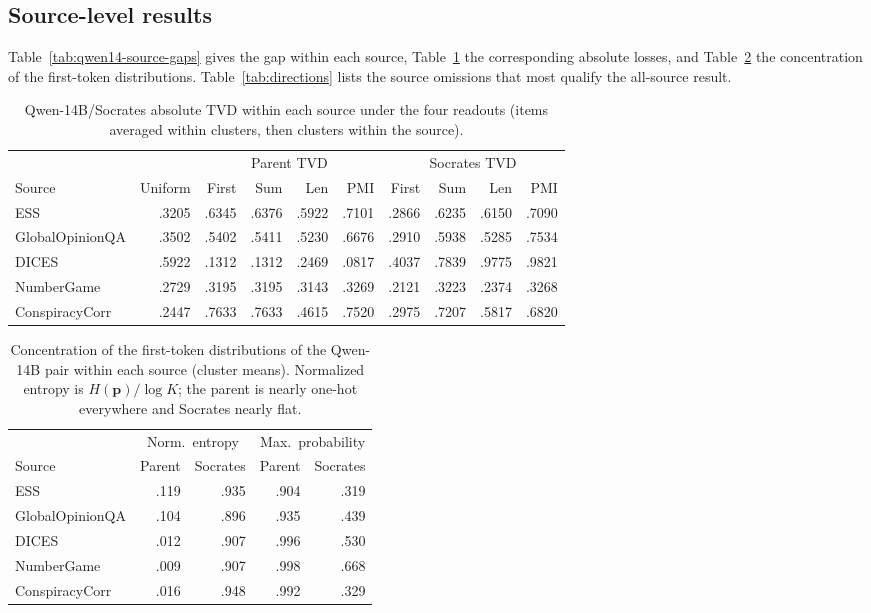 \documentclass[11pt]{article}
\begin{document}
\subsection{Source-level results}

Table~\ref{tab:qwen14-source-gaps} gives the gap within each
source, Table~\ref{tab:qwen14-source-absolute} the corresponding absolute
losses, and Table~\ref{tab:qwen14-concentration} the concentration of the
first-token distributions. Table~\ref{tab:directions} lists the source omissions that most
qualify the all-source result.



\begin{table}[t]
\centering
\scriptsize
\setlength{\tabcolsep}{4pt}
\begin{tabular}{@{}lrrrrrrrrr@{}}
\toprule
& & \multicolumn{4}{c}{Parent TVD} & \multicolumn{4}{c}{Socrates TVD} \\
\cmidrule(lr){3-6}\cmidrule(l){7-10}
Source & Uniform & First & Sum & Len & PMI & First & Sum & Len & PMI \\
\midrule
ESS & .3205 & .6345 & .6376 & .5922 & .7101 & .2866 & .6235 & .6150 & .7090 \\
GlobalOpinionQA & .3502 & .5402 & .5411 & .5230 & .6676 & .2910 & .5938 & .5285 & .7534 \\
DICES & .5922 & .1312 & .1312 & .2469 & .0817 & .4037 & .7839 & .9775 & .9821 \\
NumberGame & .2729 & .3195 & .3195 & .3143 & .3269 & .2121 & .3223 & .2374 & .3268 \\
ConspiracyCorr & .2447 & .7633 & .7633 & .4615 & .7520 & .2975 & .7207 & .5817 & .6820 \\
\bottomrule
\end{tabular}
\caption{Qwen-14B/Socrates absolute TVD within each source under the four
readouts (items averaged within clusters, then clusters within the source).}
\label{tab:qwen14-source-absolute}
\end{table}

\begin{table}[t]
\centering\small
\setlength{\tabcolsep}{6pt}
\begin{tabular}{@{}lrrrr@{}}
\toprule
& \multicolumn{2}{c}{Norm.\ entropy} & \multicolumn{2}{c}{Max.\ probability} \\
\cmidrule(lr){2-3}\cmidrule(l){4-5}
Source & Parent & Socrates & Parent & Socrates \\
\midrule
ESS & .119 & .935 & .904 & .319 \\
GlobalOpinionQA & .104 & .896 & .935 & .439 \\
DICES & .012 & .907 & .996 & .530 \\
NumberGame & .009 & .907 & .998 & .668 \\
ConspiracyCorr & .016 & .948 & .992 & .329 \\
\bottomrule
\end{tabular}
\caption{Concentration of the first-token distributions of the Qwen-14B pair
within each source (cluster means). Normalized entropy is $H(\mathbf p)/\log K$;
the parent is nearly one-hot everywhere and Socrates nearly flat.}
\label{tab:qwen14-concentration}
\end{table}
\end{document}
